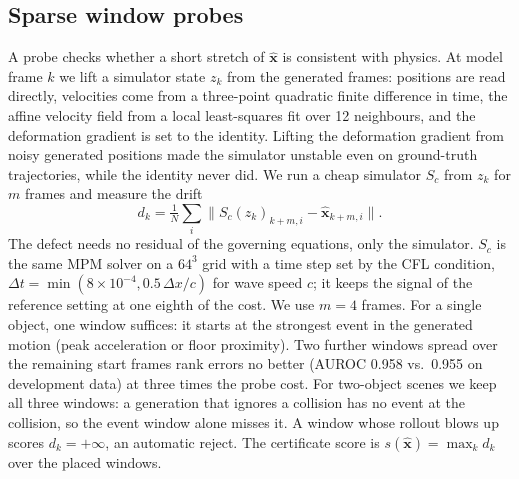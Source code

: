 \subsection{Sparse window probes}
\label{sec:probes}
A probe checks whether a short stretch of $\hat{\mathbf{x}}$ is consistent with physics.
At model frame $k$ we lift a simulator state $z_k$ from the generated frames: positions are read directly, velocities come from a three-point quadratic finite difference in time, the affine velocity field from a local least-squares fit over 12 neighbours, and the deformation gradient is set to the identity.
Lifting the deformation gradient from noisy generated positions made the simulator unstable even on ground-truth trajectories, while the identity never did.
We run a cheap simulator $S_c$ from $z_k$ for $m$ frames and measure the drift
\begin{equation}
  d_k = \tfrac{1}{N}\textstyle\sum_i \lVert S_c(z_k)_{k+m,i} - \hat{\mathbf{x}}_{k+m,i} \rVert .
\end{equation}
The defect needs no residual of the governing equations, only the simulator.
$S_c$ is the same MPM solver on a $64^3$ grid with a time step set by the CFL condition, $\Delta t = \min(8{\times}10^{-4}, 0.5\,\Delta x / c)$ for wave speed $c$; it keeps the signal of the reference setting at one eighth of the cost.
We use $m = 4$ frames.
For a single object, one window suffices: it starts at the strongest event in the generated motion (peak acceleration or floor proximity).
Two further windows spread over the remaining start frames rank errors no better (AUROC 0.958 vs.\ 0.955 on development data) at three times the probe cost.
For two-object scenes we keep all three windows: a generation that ignores a collision has no event at the collision, so the event window alone misses it.
A window whose rollout blows up scores $d_k = +\infty$, an automatic reject.
The certificate score is $s(\hat{\mathbf{x}}) = \max_k d_k$ over the placed windows.

